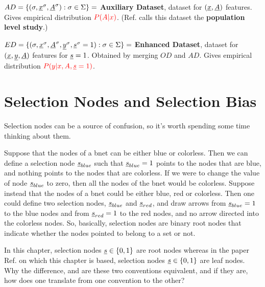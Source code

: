 $AD=\{(\sigma, {\underline{x}}^\sigma,{\underline{A}}^\sigma):\sigma\in\Sigma\}=$ 
{\bf Auxiliary Dataset}, dataset for $({\underline{x}}, {\underline{A}})$ features.
Gives empirical
distribution $\color{red}{P(A|x)}$.
(Ref.\cite{bare-sb-removal} 
calls this dataset the 
{\bf population level study}.)


$ED=\{(\sigma,{\underline{x}}^\sigma, {\underline{A}}^\sigma, {\underline{y}}^\sigma,{\underline{s}}^\sigma=1):\sigma\in\Sigma\}=$ 
{\bf Enhanced Dataset}, dataset for $({\underline{x}},{\underline{y}}, {\underline{A}})$ features
for ${\underline{s}}=1$.
Obtained by merging $OD$ and $AD$.
Gives empirical
distribution $\color{red}{P(y|x, A, {\underline{s}}=1)}$.

\section{Selection Nodes
and Selection Bias}
Selection
nodes can be a source
of confusion,
so it's worth 
spending some time
thinking about them.


Suppose that the nodes
of a bnet can be either
blue or colorless.
Then we can define 
a selection
node ${\underline{s}}_{blue}$
such that 
${\underline{s}}_{blue}=1$
points
to the nodes that 
are blue, and
nothing
points
to the nodes that are 
colorless.
If we were to
change the value of 
node ${\underline{s}}_{blue}$ to
zero, 
then all the nodes 
of the bnet would be colorless.
Suppose instead that 
the nodes of a bnet
could be either
blue, red or colorless.
Then one could define 
two selection nodes,
${\underline{s}}_{blue}$
and ${\underline{s}}_{red}$,
and 
draw arrows
from ${\underline{s}}_{blue}=1$
to the blue nodes
and from
${\underline{s}}_{red}=1$
to the red nodes, and no arrow 
directed into the colorless nodes.
So, basically, selection nodes
are binary root nodes
that indicate 
whether the nodes pointed to
belong to a set or not.



In this chapter,
selection nodes
${\underline{s}}\in\{0,1\}$
are {\color{red}root} nodes
whereas in
the paper Ref.\cite{bare-sb-removal}
on which this chapter
is based,
selection nodes ${\underline{s}}\in \{0,1\}$
are {\color{red}leaf} nodes.
Why the difference, and
are these two conventions
 equivalent, and if
they are, how does 
one translate
from one convention
to the other?



